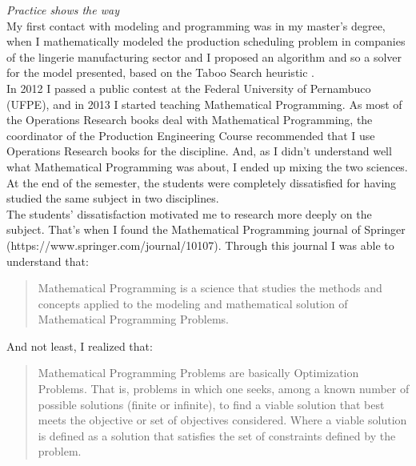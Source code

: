 \documentclass{book}
\begin{document}
\emph{Practice shows the way} \\

My first contact with modeling and programming was in my master's degree, when I mathematically modeled the production scheduling problem in companies of the lingerie manufacturing sector and I proposed an algorithm and so a solver for the model presented, based on the Taboo Search heuristic \cite{Fraga2006}. \\

In 2012 I passed a public contest at the Federal University of Pernambuco (UFPE), and in 2013 I started teaching Mathematical Programming. As most of the Operations Research books deal with Mathematical Programming, the coordinator of the Production Engineering Course recommended that I use Operations Research books for the discipline. And, as I didn't understand well what Mathematical Programming was about, I ended up mixing the two sciences. At the end of the semester, the students were completely dissatisfied for having studied the same subject in two disciplines. \\

The students' dissatisfaction motivated me to research more deeply on the subject. That's when I found the Mathematical Programming journal of Springer (https://www.springer.com/journal/10107). Through this journal I was able to understand that: \\

\begin{quotation}
\noindent Mathematical Programming is a science that studies the methods and concepts applied to the modeling and mathematical solution of Mathematical Programming Problems. \\
\end{quotation}

And not least, I realized that: \\

\begin{quotation}

\noindent Mathematical Programming Problems are basically Optimization Problems. That is, problems in which one seeks, among a known number of possible solutions (finite or infinite), to find a viable solution that best meets the objective or set of objectives considered. Where a viable solution is defined as a solution that satisfies the set of constraints defined by the problem. \\

\end{quotation}
\end{document}
